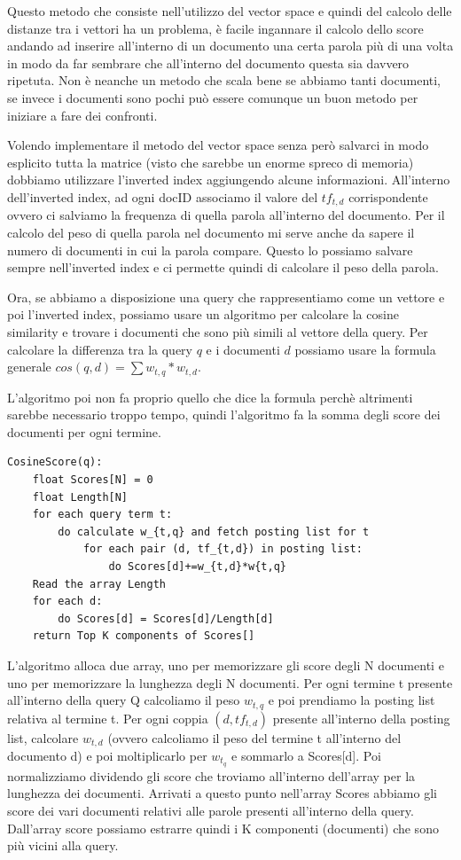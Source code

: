 \documentclass[14pt]{extreport}
\begin{document}
Questo metodo che consiste nell'utilizzo del vector space e quindi del calcolo delle distanze tra i vettori ha un problema, è facile ingannare il calcolo dello score andando ad inserire all'interno di un documento una certa parola più di una volta in modo da far sembrare che all'interno del documento questa sia davvero ripetuta.
Non è neanche un metodo che scala bene se abbiamo tanti documenti, se invece i documenti sono pochi può essere comunque un buon metodo per iniziare a fare dei confronti.

Volendo implementare il metodo del vector space senza però salvarci in modo esplicito tutta la matrice (visto che sarebbe un enorme spreco di memoria) dobbiamo utilizzare l'inverted index aggiungendo alcune informazioni.
All'interno dell'inverted index, ad ogni docID associamo il valore del $tf_{t,d}$ corrispondente ovvero ci salviamo la frequenza di quella parola all'interno del documento.
Per il calcolo del peso di quella parola nel documento mi serve anche da sapere il numero di documenti in cui la parola compare. Questo lo possiamo salvare sempre nell'inverted index e ci permette quindi di calcolare il peso della parola.

Ora, se abbiamo a disposizione una query che rappresentiamo come un vettore e poi l'inverted index, possiamo usare un algoritmo per calcolare la cosine similarity e trovare i documenti che sono più simili al vettore della query.
Per calcolare la differenza tra la query $q$ e i documenti $d$ possiamo usare la formula generale $cos(q,d) = \sum w_{t,q} * w_{t,d}$.

L'algoritmo poi non fa proprio quello che dice la formula perchè altrimenti sarebbe necessario troppo tempo, quindi l'algoritmo fa la somma degli score dei documenti per ogni termine.


\begin{lstlisting}
CosineScore(q):
    float Scores[N] = 0
    float Length[N]
    for each query term t:
        do calculate w_{t,q} and fetch posting list for t
            for each pair (d, tf_{t,d}) in posting list:
                do Scores[d]+=w_{t,d}*w{t,q}
    Read the array Length
    for each d:
        do Scores[d] = Scores[d]/Length[d]
    return Top K components of Scores[]
\end{lstlisting}

L'algoritmo alloca due array, uno per memorizzare gli score degli N documenti e uno per memorizzare la lunghezza degli N documenti.
Per ogni termine t presente all'interno della query Q calcoliamo il peso $w_{t,q}$ e poi prendiamo la posting list relativa al termine t. 
Per ogni coppia $(d, tf_{t,d})$ presente all'interno della posting list, calcolare $w_{t,d}$ (ovvero calcoliamo il peso del termine t all'interno del documento d) e poi moltiplicarlo per $w_{t_q}$ e sommarlo a Scores[d].
Poi normalizziamo dividendo gli score che troviamo all'interno dell'array per la lunghezza dei documenti.
Arrivati a questo punto nell'array Scores abbiamo gli score dei vari documenti relativi alle parole presenti all'interno della query. 
Dall'array score possiamo estrarre quindi i K componenti (documenti) che sono più vicini alla query.
\end{document}
